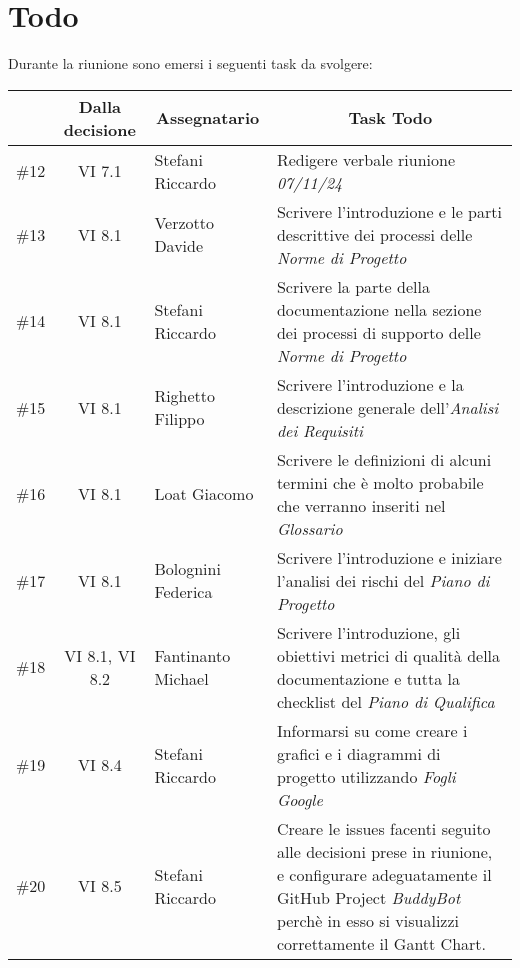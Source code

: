 

\section{Todo}

Durante la riunione sono emersi i seguenti task da svolgere:

\vspace{0.5cm}

\begin{table}[htbp]
\centering
{}
\begin{tabular}{|c|c|p{}|p{}|}
    \hline
    \rowcolor[gray]{0.75}
    \multicolumn{1}{|c|}{\textbf{Codice}} & \multicolumn{1}{|c|}{\textbf{Dalla decisione}} & \multicolumn{1}{|c|}{\textbf{Assegnatario}} & \multicolumn{1}{|c|}{\textbf{Task Todo}} \\
    \hline
    \#12 & VI 7.1 & Stefani Riccardo & Redigere verbale riunione \emph{07/11/24} \\
    \hline
    \#13 & VI 8.1 & Verzotto Davide & Scrivere l'introduzione e le parti descrittive dei processi delle \emph{Norme di Progetto} \\
    \hline
    \#14 & VI 8.1 & Stefani Riccardo & Scrivere la parte della documentazione nella sezione dei processi di supporto delle \emph{Norme di Progetto} \\
    \hline
    \#15 & VI 8.1 & Righetto Filippo & Scrivere l'introduzione e la descrizione generale dell'\emph{Analisi dei Requisiti} \\
    \hline
    \#16 & VI 8.1 & Loat Giacomo & Scrivere le definizioni di alcuni termini che è molto probabile che verranno inseriti nel \emph{Glossario} \\
    \hline
    \#17 & VI 8.1 & Bolognini Federica & Scrivere l'introduzione e iniziare l'analisi dei rischi del \emph{Piano di Progetto} \\
    \hline
    \#18 & VI 8.1, VI 8.2 & Fantinanto Michael & Scrivere l'introduzione, gli obiettivi metrici di qualità della documentazione e tutta
    la checklist del \emph{Piano di Qualifica} \\
    \hline
    \#19 & VI 8.4 & Stefani Riccardo & Informarsi su come creare i grafici e i diagrammi di progetto utilizzando \emph{Fogli Google} \\
    \hline
    \#20 & VI 8.5 & Stefani Riccardo & Creare le issues facenti seguito alle decisioni prese in riunione, e configurare adeguatamente il 
    GitHub Project \emph{BuddyBot} perchè in esso si visualizzi correttamente il Gantt Chart. \\
    \hline
\end{tabular}
\end{table}
